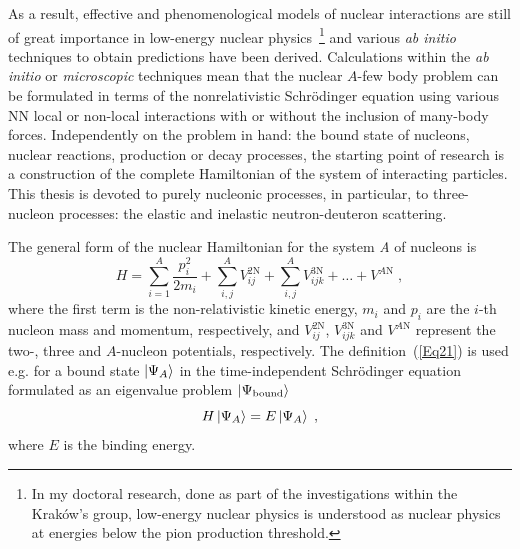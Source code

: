 As a result, effective and phenomenological models of nuclear interactions are still of great importance in low-energy nuclear physics~\footnote{In my doctoral research, done as part of the investigations within the Krak{\'o}w's group, low-energy nuclear physics is understood as nuclear physics at energies below the pion production threshold.} and various \textit{ab initio} techniques to obtain predictions have been derived. Calculations within the \textit{ab initio} or \textit{microscopic} techniques mean that the nuclear $A$-few body problem can be formulated in terms of the nonrelativistic Schr\"odinger equation using various NN local or non-local interactions with or without the inclusion of many-body forces. Independently on the problem in hand: the bound state of nucleons, nuclear reactions, production or decay processes, the starting point of research is a construction of the complete Hamiltonian of the system of interacting particles. This thesis is devoted to purely nucleonic processes, in particular, to three-nucleon processes: the elastic and inelastic neutron-deuteron scattering. 

The general form of the nuclear Hamiltonian for the system \textit {A} of nucleons is
\begin{equation}
H = \sum\limits_{i = 1}^{A}\frac{p^{2}_{i}}{2m_{i}} + \sum\limits_{i,j}^{A}V_{ij}^{\mathrm{2N}}+ \sum\limits_{i,j}^{A}V_{ijk}^{\mathrm{3N}} + \ldots + V^{A\mathrm{N}}\;,
\label{Eq21}
\end{equation} 
where the first term is the non-relativistic kinetic energy, $m_{i}$ and $p_{i}$ are the $i$-th nucleon mass and momentum, respectively, and $V^{\mathrm{2N}}_{ij}$, $V^{\mathrm{3N}}_{ijk}$ and $V^{A\mathrm{N}}$ represent the two-, three and $A$-nucleon potentials, respectively. 
The definition~(\ref{Eq21}) is used e.g. for a bound state $\ket{\Psi_{A}}$ in the time-independent Schr\"odinger equation formulated as an eigenvalue problem $\ket{\Psi_{\mathrm{bound}}}$
\begin{equation}
H\ket{\Psi_{A}} = E\ket{\Psi_{A}}\;,
\label{Eq22}
\end{equation}
where $E$ is the binding energy. 

